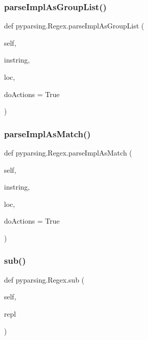 \subsubsection{\texorpdfstring{parse\+Impl\+As\+Group\+List()}{parseImplAsGroupList()}}
{\footnotesize\ttfamily def pyparsing.\+Regex.\+parse\+Impl\+As\+Group\+List (\begin{DoxyParamCaption}\item[{}]{self,  }\item[{}]{instring,  }\item[{}]{loc,  }\item[{}]{do\+Actions = {\ttfamily True} }\end{DoxyParamCaption})}

\mbox{\label{classpyparsing_1_1Regex_a68a84127274ff9f440af354b62c5adb5}} 
\subsubsection{\texorpdfstring{parse\+Impl\+As\+Match()}{parseImplAsMatch()}}
{\footnotesize\ttfamily def pyparsing.\+Regex.\+parse\+Impl\+As\+Match (\begin{DoxyParamCaption}\item[{}]{self,  }\item[{}]{instring,  }\item[{}]{loc,  }\item[{}]{do\+Actions = {\ttfamily True} }\end{DoxyParamCaption})}

\mbox{\label{classpyparsing_1_1Regex_af31e2a3be906135d8e88ac52ef8aaaef}} 
\subsubsection{\texorpdfstring{sub()}{sub()}}
{\footnotesize\ttfamily def pyparsing.\+Regex.\+sub (\begin{DoxyParamCaption}\item[{}]{self,  }\item[{}]{repl }\end{DoxyParamCaption})}

